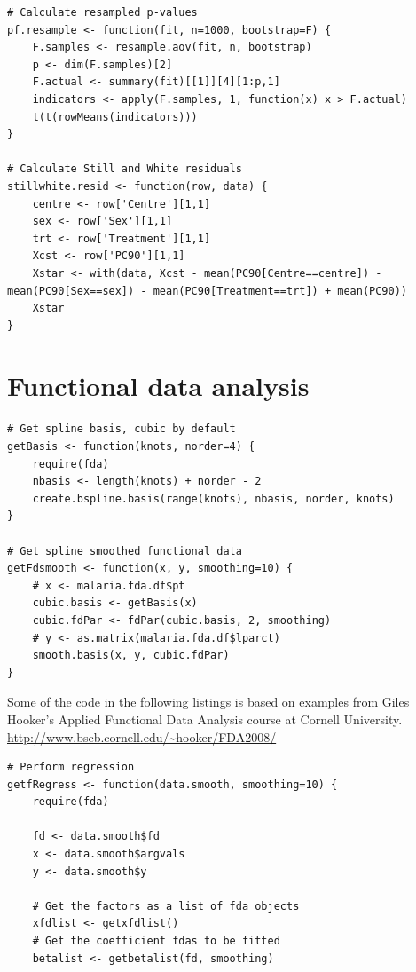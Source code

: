 \begin{singlespace}
\begin{lstlisting}[caption=Functions to calculate resampled $p$-values and resampling residuals,label=R:resampmisc]
# Calculate resampled p-values
pf.resample <- function(fit, n=1000, bootstrap=F) {
	F.samples <- resample.aov(fit, n, bootstrap)
	p <- dim(F.samples)[2]
	F.actual <- summary(fit)[[1]][4][1:p,1]
	indicators <- apply(F.samples, 1, function(x) x > F.actual)
	t(t(rowMeans(indicators)))
}

# Calculate Still and White residuals
stillwhite.resid <- function(row, data) {
	centre <- row['Centre'][1,1]
	sex <- row['Sex'][1,1]
	trt <- row['Treatment'][1,1]
	Xcst <- row['PC90'][1,1]
	Xstar <- with(data, Xcst - mean(PC90[Centre==centre]) - mean(PC90[Sex==sex]) - mean(PC90[Treatment==trt]) + mean(PC90))
	Xstar
}
\end{lstlisting}

\clearpage
\section{Functional data analysis}\label{R:fda}
\begin{lstlisting}[caption=Functions for cubic spline smoothing,label=R:fdsmooth]
# Get spline basis, cubic by default
getBasis <- function(knots, norder=4) {
	require(fda)
	nbasis <- length(knots) + norder - 2
	create.bspline.basis(range(knots), nbasis, norder, knots)
}

# Get spline smoothed functional data
getFdsmooth <- function(x, y, smoothing=10) {
	# x <- malaria.fda.df$pt
	cubic.basis <- getBasis(x)
	cubic.fdPar <- fdPar(cubic.basis, 2, smoothing)
	# y <- as.matrix(malaria.fda.df$lparct)
	smooth.basis(x, y, cubic.fdPar)
}
\end{lstlisting}

Some of the code in the following listings is based on examples from Giles Hooker's Applied Functional Data Analysis course at Cornell University.\\
\url{http://www.bscb.cornell.edu/~hooker/FDA2008/}
\begin{lstlisting}[caption=Functions for fda regression,label=R:fregress]
# Perform regression
getfRegress <- function(data.smooth, smoothing=10) {
	require(fda)

	fd <- data.smooth$fd
	x <- data.smooth$argvals
	y <- data.smooth$y

	# Get the factors as a list of fda objects
	xfdlist <- getxfdlist()
	# Get the coefficient fdas to be fitted
	betalist <- getbetalist(fd, smoothing)


\end{lstlisting}
\end{singlespace}
